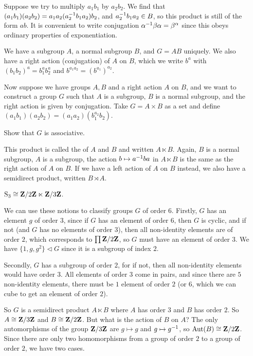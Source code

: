 \documentclass[11pt, oneside]{amsart}
\begin{document}
Suppose we try to multiply $a_1b_1$ by $a_2b_2$. We find that $(a_1b_1)(a_2b_2) = a_1a_2(a_2^{-1} b_1a_2) b_2$, and $a_2^{-1} b_1a_2\in B$, so this product is still of the form $ab$. It is convenient to write conjugation $\alpha^{-1} \beta\alpha = \beta^\alpha$ since this obeys ordinary properties of exponentiation. 

We have a subgroup $A$, a normal subgroup $B$, and $G=AB$ uniquely. We also have a right action (conjugation) of $A$ on $B$, which we write $b^a $ with $(b_1b_2)^a = b_1^a b_2^a$ and $b^{a_1a_2} = (b^{a_1})^{a_2}$.

Now suppose we have groups $A,B$ and a right action $A$ on $B$, and we want to construct a group $G$ such that $A$ is a subgroup, $B$ is a normal subgroup, and the right action is given by conjugation. Take $G = A\times B$ as a set and define $(a_1b_1)(a_2b_2)=(a_1a_2)(b_1^{a_2} b_2)$.
\begin{exercise} 
Show that $G$ is associative. %
\end{exercise}
This product is called the  of $A$ and $B$ and written $A\ltimes B$. Again, $B$ is a normal subgroup, $A$ is a subgroup, the action $b\mapsto a^{-1} b a$ in $A\ltimes B$ is the same as the right action of $A$ on $B$. If we have a left action of $A$ on $B$ instead, we also have a semidirect product, written $B \rtimes A$.

\begin{example}
$\operatorname{S}_3 \cong \mathbf Z/2\mathbf Z \ltimes \mathbf Z/3\mathbf Z$.
\end{example}

We can use these notions to classify groups $G$ of order $6$. Firstly, $G$ has an element $g$ of order $3$, since if $G$ has an element of order $6$, then $G$ is cyclic, and if not (and $G$ has no elements of order $3$), then all non-identity elements are of order $2$, which corresponds to $\prod \mathbf Z/2\mathbf Z$, so $G$ must have an element of order $3$. We have $\{1,g,g^2\}\lhd G$ since it is a subgroup of index $2$. 

Secondly, $G$ has a subgroup of order $2$, for if not, then all non-identity elements would have order $3$. All elements of order $3$ come in pairs, and since there are $5$ non-identity elements, there must be $1$ element of order $2$ (or $6$, which we can cube to get an element of order $2$). 

So $G$ is a semidirect product $A \ltimes B$ where $A$ has order $3$ and $B$ has order $2$. So $A\cong \mathbf Z/3\mathbf Z$ and $B\cong \mathbf Z/2\mathbf Z$. But what is the action of $B$ on $A$?  The only automorphisms of the group $\mathbf Z/3\mathbf Z$ are $g\mapsto g$ and $g\mapsto g^{-1}$, so $\operatorname{Aut}(B) \cong \mathbf Z/2\mathbf Z$. Since there are only two homomorphisms from a group of order $2$ to a group of order $2$, we have two cases.
\end{document}
